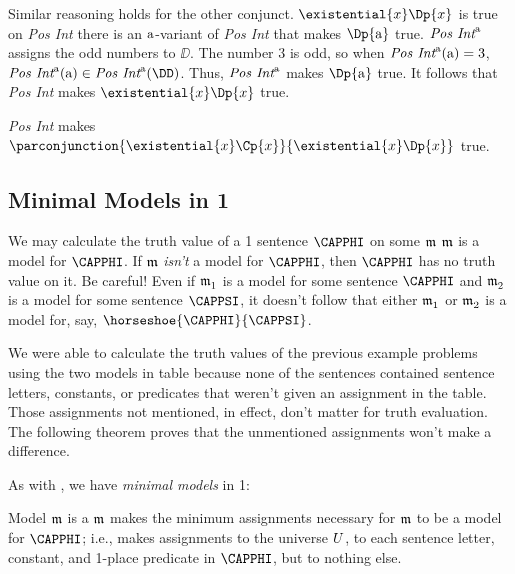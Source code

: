 \begin{PROOF}
Similar reasoning holds for the other conjunct.  $\existential{\variable{x}}\Dp{\variable{x}}$ is true on \emph{Pos Int} \Iff there is an $\mathrm{a}$-variant of \emph{Pos Int} that makes $\Dp{\constant{a}}$ true.  $\emph{Pos Int}^{\mathrm{a}}$ assigns the odd numbers to $\DD$.  The number $3$ is odd, so when $\emph{Pos Int}^{\mathrm{a}}(\mathrm{a})=3$, $\emph{Pos Int}^{\constant{a}}(\constant{a})\in\emph{Pos Int}^{\constant{a}}(\DD)$.  Thus, $\emph{Pos Int}^{\mathrm{a}}$ makes $\Dp{\constant{a}}$ true. It follows that \emph{Pos Int} makes $\existential{\variable{x}}\Dp{\variable{x}}$ true.
	
\emph{Pos Int} makes $\parconjunction{\existential{\variable{x}}\Cp{\variable{x}}}{\existential{\variable{x}}\Dp{\variable{x}}}$ true.
\end{PROOF}	

\subsection{Minimal Models in \GQL{}1}\label{Minimal Models in GQL1}

We may calculate the truth value of a \GQL{}1 sentence $\CAPPHI$ on some $\mathfrak{m}$ \Iff $\mathfrak{m}$ is a model for $\CAPPHI$.  If $\mathfrak{m}$ \emph{isn't} a model for $\CAPPHI$, then $\CAPPHI$ has no truth value on it.  Be careful!  Even if $\mathfrak{m^{\mathrm{}}_{\mathrm{1}}}$ is a model for some sentence $\CAPPHI$ and $\mathfrak{m^{\mathrm{}}_{\mathrm{2}}}$ is a model for some sentence $\CAPPSI$, it doesn't follow that either $\mathfrak{m^{\mathrm{}}_{\mathrm{1}}}$ or $\mathfrak{m^{\mathrm{}}_{\mathrm{2}}}$ is a model for, say, $\horseshoe{\CAPPHI}{\CAPPSI}$.

We were able to calculate the truth values of the previous example problems using the two models in table  because none of the sentences contained sentence letters, constants, or predicates that weren't given an assignment in the table.  Those assignments not mentioned, in effect, don't matter for truth evaluation.  The following theorem proves that the unmentioned assignments won't make a difference.

As with \GSL{}, we have \emph{minimal models} in \GQL{}1:

\begin{majorILnc}{}
	Model $\mathfrak{m}$ is a  \Iff $\mathfrak{m}$ makes the minimum assignments necessary for $\mathfrak{m}$ to be a model for $\CAPPHI$; i.e., makes assignments to the universe $U$, to each sentence letter, constant, and 1-place predicate in $\CAPPHI$, but to nothing else.
\end{majorILnc}

